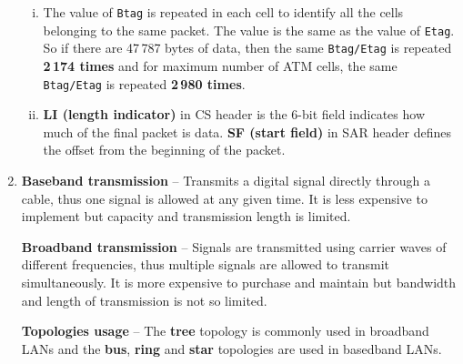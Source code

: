 \documentclass[a4paper, 11pt]{article}
\begin{document}
\begin{enumerate}
\begin{enumerate}[i)]
				\item %
					The value of \texttt{Btag} is repeated in each cell to identify all the cells belonging to the
					same packet. The value is the same as the value of \texttt{Etag}.
					So if there are 47\,787 bytes of data, then the same \texttt{Btag/Etag} is repeated
					\textbf{2\,174 times} and for maximum number of ATM cells, the same \texttt{Btag/Etag} is
					repeated \textbf{2\,980 times}.

				\item %
					\textbf{LI (length indicator)} in CS header is the 6-bit field indicates how much of the final
					packet is data. \textbf{SF (start field)} in SAR header defines the offset from the beginning
					of the packet.
			\end{enumerate}

		\item %
			\textbf{Baseband transmission} -- Transmits a digital signal directly through a cable, thus one
			signal is allowed at any given time. It is less expensive to implement but capacity and transmission
			length is limited.

			\textbf{Broadband transmission} -- Signals are transmitted using carrier waves of different frequencies,
			thus multiple signals are allowed to transmit simultaneously. It is more expensive to purchase and
			maintain but bandwidth and length of transmission is not so limited.

			\textbf{Topologies usage} -- The \textbf{tree} topology is commonly used in broadband LANs and the
			\textbf{bus}, \textbf{ring} and \textbf{star} topologies are used in basedband LANs.


\end{enumerate}
\end{document}
